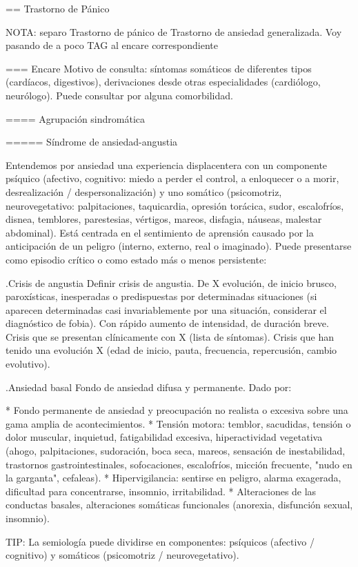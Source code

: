 \documentclass[encares.tex]{subfiles}
\begin{document}
== Trastorno de Pánico

NOTA: separo Trastorno de pánico de Trastorno de ansiedad generalizada. Voy pasando de a poco TAG al encare correspondiente

=== Encare
Motivo de consulta: síntomas somáticos de diferentes tipos (cardíacos, digestivos), derivaciones desde otras especialidades (cardiólogo, neurólogo). Puede consultar por alguna comorbilidad.

==== Agrupación sindromática

===== Síndrome de ansiedad-angustia

Entendemos por ansiedad una experiencia displacentera con un componente psíquico (afectivo, cognitivo: miedo a perder el control, a enloquecer o a morir, desrealización / despersonalización) y uno somático (psicomotriz, neurovegetativo: palpitaciones, taquicardia, opresión torácica, sudor, escalofríos, disnea, temblores, parestesias, vértigos, mareos, disfagia, náuseas, malestar abdominal). Está centrada en el sentimiento de aprensión causado por la anticipación de un peligro (interno, externo, real o imaginado). Puede presentarse como episodio crítico o como estado más o menos persistente:

.Crisis de angustia
Definir crisis de angustia. De X evolución, de inicio brusco, paroxísticas, inesperadas o predispuestas por determinadas situaciones (si aparecen determinadas casi invariablemente por una situación, considerar el diagnóstico de fobia). Con rápido aumento de intensidad, de duración breve.  Crisis que se presentan clínicamente con X (lista de síntomas). Crisis que han tenido una evolución X (edad de inicio, pauta, frecuencia, repercusión, cambio evolutivo).

.Ansiedad basal
Fondo de ansiedad difusa y permanente. Dado por:

* Fondo permanente de ansiedad y preocupación no realista o excesiva sobre una gama amplia de acontecimientos.
* Tensión motora: temblor, sacudidas, tensión o dolor muscular, inquietud, fatigabilidad excesiva, hiperactividad vegetativa (ahogo, palpitaciones, sudoración, boca seca, mareos, sensación de inestabilidad, trastornos gastrointestinales, sofocaciones, escalofríos, micción frecuente, "nudo en la garganta", cefaleas).
* Hipervigilancia: sentirse en peligro, alarma exagerada, dificultad para concentrarse, insomnio, irritabilidad.
* Alteraciones de las conductas basales, alteraciones somáticas funcionales (anorexia, disfunción sexual, insomnio).

TIP: La semiología puede dividirse en componentes: psíquicos (afectivo / cognitivo) y somáticos (psicomotriz / neurovegetativo).
\end{document}
